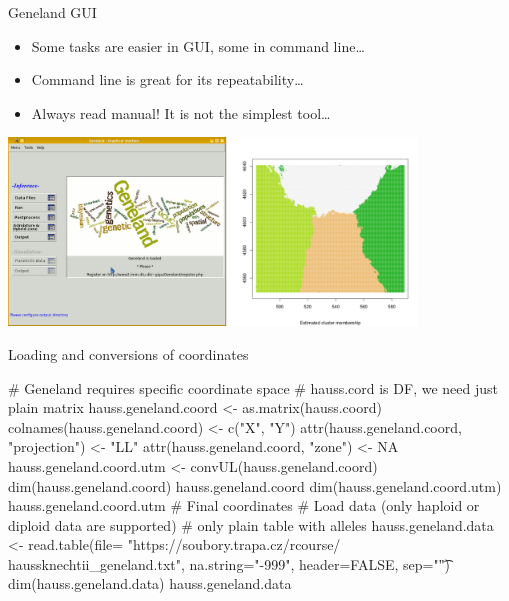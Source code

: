 \documentclass[compress, ucs, xelatex, 11pt, xcolor=svgnames, aspectratio=169,
	hyperref={
		bookmarks=true,
		unicode=true,
		colorlinks=true,
		pdftitle={Molecular data in R},
		plainpages=false,
		pdfauthor={Vojtech Zeisek},
		pdfsubject={Course about phylogeny and evolution in R},
		pdfcreator={XeLaTeX},
		pdfkeywords={R, evolution, phylogeny, molecular data},
		linkcolor=Crimson, %
		anchorcolor=Magenta, %
		citecolor=Magenta, %
		filecolor=Magenta, %
		menucolor=Magenta, %
		urlcolor=DodgerBlue, %
		pdftex},
	url={hyphens, lowtilde} %
	]{beamer}
\begin{document}
\begin{frame}{Geneland GUI}
	\begin{itemize}
		\item Some tasks are easier in GUI, some in command line\ldots
		\item Command line is great for its repeatability\ldots
		\item Always read manual! It is not the simplest tool\ldots
	\end{itemize}
	\begin{center}
		\includegraphics[height=5cm]{geneland_gui.png}
	\end{center}
\end{frame}

\begin{frame}[fragile]{Loading and conversions of coordinates}
	\begin{spluscode}
    # Geneland requires specific coordinate space
    # hauss.cord is DF, we need just plain matrix
    hauss.geneland.coord <- as.matrix(hauss.coord)
    colnames(hauss.geneland.coord) <- c("X", "Y")
    attr(hauss.geneland.coord, "projection") <- "LL"
    attr(hauss.geneland.coord, "zone") <- NA
    hauss.geneland.coord.utm <- convUL(hauss.geneland.coord)
    dim(hauss.geneland.coord)
    hauss.geneland.coord
    dim(hauss.geneland.coord.utm)
    hauss.geneland.coord.utm # Final coordinates
    # Load data (only haploid or diploid data are supported)
    # only plain table with alleles
    hauss.geneland.data <- read.table(file= "https://soubory.trapa.cz/rcourse/
      haussknechtii_geneland.txt", na.string="-999", header=FALSE, sep="\t")
    dim(hauss.geneland.data)
    hauss.geneland.data
	\end{spluscode}
\end{frame}
\end{document}
